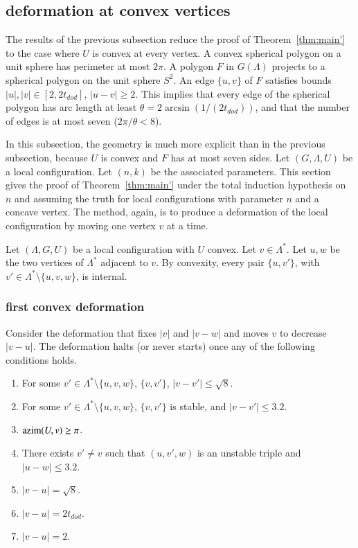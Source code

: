 \subsection{deformation at convex vertices}

The results of the previous subsection
reduce the proof of Theorem~\ref{thm:main'} to
the case where $U$ is convex at every vertex.  A convex
spherical polygon on a unit sphere has perimeter
at most $2\pi$.  A polygon $F$ in $G(\Lambda)$ projects to
a spherical polygon on the unit sphere $S^2$.  An edge $\{u,v\}$ of
$F$ satisfies bounds $|u|,|v|\in[2,2t_{dod}]$, $|u-v|\ge 2$. This
implies that every edge of the spherical polygon has arc length
at least $\theta=2\arcsin(1/(2t_{dod}))$, and that the number
of edges is at most seven ($2\pi/\theta < 8$).

In this subsection, the geometry is much more explicit than in the
previous subsection, because $U$ is convex and $F$ has at most seven sides.
Let $(G,\Lambda,U)$ be a local configuration.
Let $(n,k)$ be the associated parameters.
This section gives the proof of Theorem~\ref{thm:main'} under 
the total induction hypothesis on $n$ and assuming the truth
for local configurations with parameter $n$ and a concave vertex.
The method, again, is to produce a deformation of the local
configuration by moving one vertex $v$ at a time.



Let $(\Lambda,G,U)$ be a local configuration with $U$ convex.
Let $v\in\Lambda^*$.  
Let $u,w$ be the two vertices of $\Lambda^*$
adjacent to $v$.  By convexity, every pair $\{u,v'\}$,
with $v'\in\Lambda^*\setminus\{u,v,w\}$, is internal.


\subsubsection{first convex deformation}

Consider the deformation that fixes $|v|$ and $|v-w|$ and
moves $v$ to decrease $|v-u|$.  
The deformation halts (or never starts) once any
of the following conditions holds.
\begin{enumerate}\label{e:halt-convex}
\item For some $v'\in\Lambda^*\setminus\{u,v,w\}$, 
$\{v,v'\}$, $|v-v'|\le \sqrt8$.
\item For some $v'\in\Lambda^*\setminus\{u,v,w\}$,
$\{v,v'\}$ is  stable, and $|v-v'|\le 3.2$.
\item ${\operatorname{azim}}(U,v)\ge\pi$.
\item There exists $v'\ne v$ such that 
$(u,v',w)$ is an unstable triple and $|u-w|\le3.2$.
\item $|v-u|=\sqrt8$.
\item $|v-u|=2t_{dod}$.
\item $|v-u|=2$.
\end{enumerate}

